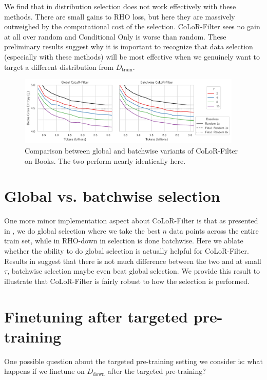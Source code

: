 \documentclass{article}
\newcommand{\Ddown}{D_{\text{down}}}
\newcommand{\Dtrain}{D_{\text{train}}}
\begin{document}
We find that in distribution selection does not work effectively with these methods. There are small gains to RHO loss, but here they are massively outweighed by the computational cost of the selection. CoLoR-Filter sees no gain at all over random and Conditional Only is worse than random. These preliminary results suggest why it is important to recognize that data selection (especially with these methods) will be most effective when we genuinely want to target a different distribution from $ \Dtrain$.

\begin{figure}[h]
    \centering
    \includegraphics[width=0.95\textwidth]{images/books_batchwise.pdf}
    \caption{Comparison between global and batchwise variants of CoLoR-Filter on Books. The two perform nearly identically here.}
    \label{fig:batch}
\end{figure}

\section{Global vs. batchwise selection}\label{app:batchwise}



One more minor implementation aspect about CoLoR-Filter is that as presented in , we do global selection where we take the best $ n$ data points across the entire train set, while in RHO-down in  selection is done batchwise. Here we ablate whether the ability to do global selection is actually helpful for CoLoR-Filter. Results in  suggest that there is not much difference between the two and at small $ \tau$, batchwise selection maybe even beat global selection. We provide this result to illustrate that CoLoR-Filter is fairly robust to how the selection is performed. 


\section{Finetuning after targeted pre-training}\label{app:finetune}

One possible question about the targeted pre-training setting we consider is: what happens if we finetune on $ \Ddown$ after the targeted pre-training?
\end{document}
